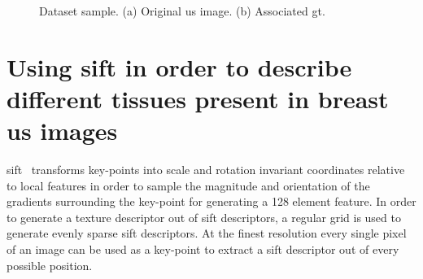 \documentclass[a4paper, 10pt, conference]{llncs}      %
\begin{document}
\begin{figure}[Hbp]
{
}

\caption{Dataset sample. (a) Original \ac{us} image. (b) Associated \ac{gt}.}
\label{fig:dataExample}
\end{figure}

\section{Using \ac{sift} in order to describe different tissues present in breast \acs{us} images}
\acf{sift}~\cite{lowe2004distinctive} transforms key-points into scale and rotation invariant coordinates relative to local features in order to sample the magnitude and orientation of the gradients surrounding the key-point for generating a 128 element feature. In order to generate a texture descriptor out of \ac{sift} descriptors, a regular grid is used to generate evenly sparse \ac{sift} descriptors. At the finest resolution every single pixel of an image can be used as a key-point to extract a \ac{sift} descriptor out of every possible position.
\end{document}
